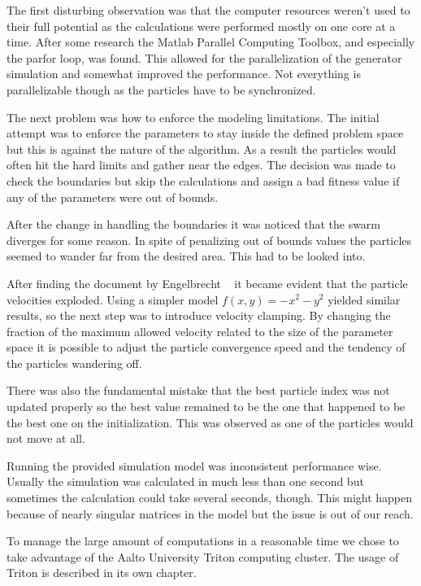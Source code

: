 \documentclass[twoside]{article}
\begin{document}
\begin{multicols}{2}
	The first disturbing observation was that the computer resources weren't used to their full potential as the calculations were performed mostly on one core at a time. After some research the Matlab Parallel Computing Toolbox, and especially the parfor loop, was found. This allowed for the parallelization of the generator simulation and somewhat improved the performance. Not everything is parallelizable though as the particles have to be synchronized. 
	
	The next problem was how to enforce the modeling limitations. The initial attempt was to enforce the parameters to stay inside the defined problem space but this is against the nature of the algorithm. As a result the particles would often hit the hard limits and gather near the edges. The decision was made to check the boundaries but skip the calculations and assign a bad fitness value if any of the parameters were out of bounds.
	
	After the change in handling the boundaries it was noticed that the swarm diverges for some reason. In spite of penalizing out of bounds values the particles seemed to wander far from the desired area. This had to be looked into.
	
	After finding the document by Engelbrecht ~\cite{pitfalls} it became evident that the particle velocities exploded. Using a simpler model $f(x,y)=-x^2-y^2$ yielded similar results, so the next step was to introduce velocity clamping. By changing the fraction of the maximum allowed velocity related to the size of the parameter space it is possible to adjust the particle convergence speed and the tendency of the particles wandering off.
	
	There was also the fundamental mistake that the best particle index was not updated properly so the best value remained to be the one that happened to be the best one on the initialization. This was observed as one of the particles would not move at all.

	Running the provided simulation model was inconsistent performance wise. Usually the simulation was calculated in much less than one second but sometimes the calculation could take several seconds, though. This might happen because of nearly singular matrices in the model but the issue is out of our reach.

	To manage the large amount of computations in a reasonable time we chose to take advantage of the Aalto University Triton computing cluster. The usage of Triton is described in its own chapter.


\end{multicols}
\end{document}
